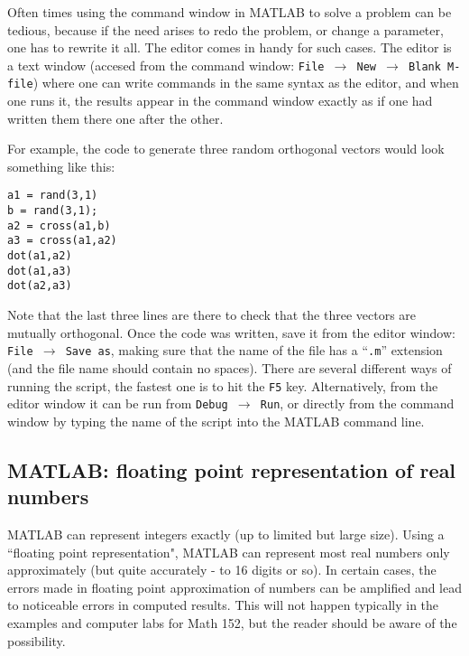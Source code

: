 Often times using the command window in MATLAB to solve a problem can be tedious, because if the need arises to redo the problem, or change a parameter, one has to rewrite it all. The editor comes in handy for such cases. The editor is a text window (accesed from the command window: {\tt File $\rightarrow$ New $\rightarrow$ Blank M-file}) where one can write commands in the same syntax as the editor, and when one runs it, the results appear in the command window exactly as if one had written them there one after the other.

For example, the code to generate three random orthogonal vectors would look something like this:
\begin{verbatim}
a1 = rand(3,1)
b = rand(3,1);
a2 = cross(a1,b)
a3 = cross(a1,a2)
dot(a1,a2)
dot(a1,a3)
dot(a2,a3)
\end{verbatim}
Note that the last three lines are there to check that the three vectors are mutually orthogonal. Once the code was written, save it from the editor window: {\tt File $\rightarrow$ Save as}, making sure that the name of the file has a ``{\tt .m}'' extension (and the file name should contain no spaces). There are several different ways of running the script, the fastest one is to hit the {\tt F5} key. Alternatively, from the editor window it can be run from {\tt Debug $\rightarrow$ Run}, or directly from the command window by typing the name of the script into the MATLAB command line.

\subsection{MATLAB: floating point representation of real numbers}
\label{sec:floating}

MATLAB can represent integers exactly (up to limited but large size). Using a 
``floating point representation", MATLAB can represent 
most real numbers only approximately (but quite accurately - to 16 digits or so). In certain 
cases, the errors made in floating point approximation of numbers can be amplified 
and lead to noticeable errors in computed results. This will not happen typically in the 
examples and computer labs for Math 152, but the reader should be aware of the possibility. 

